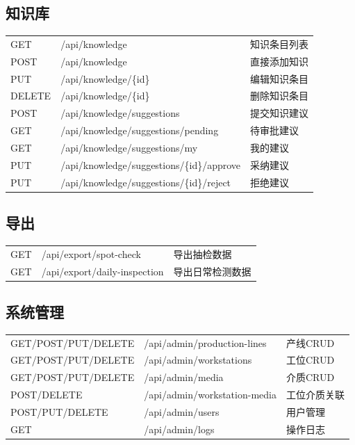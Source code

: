 \documentclass[12pt,a4paper]{ctexart}
\begin{document}
\subsection{知识库}

\begin{tabular}{|l|l|l|}
\hline
GET & /api/knowledge & 知识条目列表 \\
POST & /api/knowledge & 直接添加知识 \\
PUT & /api/knowledge/\{id\} & 编辑知识条目 \\
DELETE & /api/knowledge/\{id\} & 删除知识条目 \\
POST & /api/knowledge/suggestions & 提交知识建议 \\
GET & /api/knowledge/suggestions/pending & 待审批建议 \\
GET & /api/knowledge/suggestions/my & 我的建议 \\
PUT & /api/knowledge/suggestions/\{id\}/approve & 采纳建议 \\
PUT & /api/knowledge/suggestions/\{id\}/reject & 拒绝建议 \\
\hline
\end{tabular}

\subsection{导出}

\begin{tabular}{|l|l|l|}
\hline
GET & /api/export/spot-check & 导出抽检数据 \\
GET & /api/export/daily-inspection & 导出日常检测数据 \\
\hline
\end{tabular}

\subsection{系统管理}

\begin{tabular}{|l|l|l|}
\hline
GET/POST/PUT/DELETE & /api/admin/production-lines & 产线CRUD \\
GET/POST/PUT/DELETE & /api/admin/workstations & 工位CRUD \\
GET/POST/PUT/DELETE & /api/admin/media & 介质CRUD \\
POST/DELETE & /api/admin/workstation-media & 工位介质关联 \\
POST/PUT/DELETE & /api/admin/users & 用户管理 \\
GET & /api/admin/logs & 操作日志 \\
\hline
\end{tabular}
\end{document}
